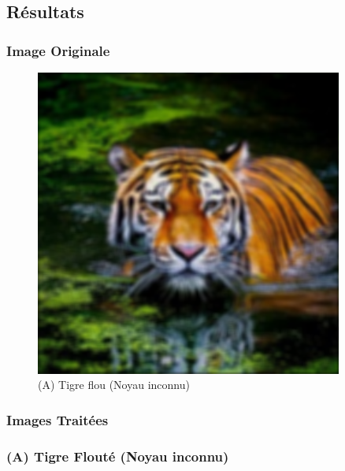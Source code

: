 \subsection{Résultats}
\subsubsection{Image Originale}

\begin{figure}[h!]
    \centering
    \begin{minipage}[b]{0.45\textwidth}
        \centering
        \includegraphics[width=0.9\textwidth]{images/blind_originals/tiger.png}
        \caption*{(A) Tigre flou (Noyau inconnu)}
    \end{minipage}
\end{figure}

\subsubsection{Images Traitées}

\subsubsection*{(A) Tigre Flouté (Noyau inconnu)}

